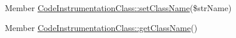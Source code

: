 \label{test__test000002}
\hypertarget{test__test000002}{}
 \begin{description}
\item[Member \hyperlink{class_code_instrumentation_class_7509724e5c69f85c5ccfb7d9d68d2357}{CodeInstrumentationClass::setClassName}(\$strName) ]\end{description}


\label{test__test000001}
\hypertarget{test__test000001}{}
 \begin{description}
\item[Member \hyperlink{class_code_instrumentation_class_a52a8e309c35cfdaf18706511fb9eca5}{CodeInstrumentationClass::getClassName}() ]\end{description}
